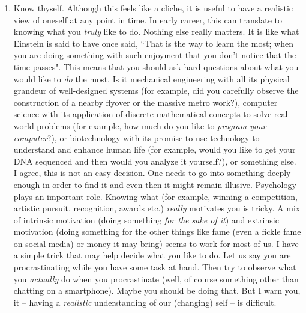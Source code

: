 \documentclass[a6paper]{article}
\begin{document}
\begin{enumerate}
    \item Know thyself. Although this feels like a cliche, it is useful to have a realistic view of oneself at any point in time. In early career, this can translate to knowing what you \emph{truly} like to do. Nothing else really matters. It is like what Einstein is said to have once said, ``That is the way to learn the most; when you are doing something with such enjoyment that you don't notice that the time passes". This means that you should ask hard questions about what you would like to \emph{do} the most. Is it mechanical engineering with all its physical grandeur of well-designed systems (for example, did you carefully observe the construction of a nearby flyover or the massive metro work?), computer science with its application of discrete mathematical concepts to solve real-world problems (for example, how much do you like to \emph{program your computer}?), or biotechnology with its promise to use technology to understand and enhance human life (for example, would you like to get your DNA sequenced and then would you analyze it yourself?), or something else. I agree, this is not an easy decision. One needs to go into something deeply enough in order to find it and even then it might remain illusive. Psychology plays an important role. Knowing what (for example, winning a competition, artistic pursuit, recognition, awards etc.) \emph{really} motivates you is tricky. A mix of intrinsic motivation (doing something \emph{for the sake of it}) and extrinsic motivation (doing something for the other things like fame (even a fickle fame on social media) or money it may bring) seems to work for most of us. I have a simple trick that may help decide what you like to do. Let us say you are procrastinating while you have some task at hand. Then try to observe what you \emph{actually} do when you procrastinate (well, of course something other than chatting on a smartphone). Maybe you should be doing that. But I warn you, it -- having a \emph{realistic} understanding of our (changing) self -- is difficult. 

\end{enumerate}
\end{document}

